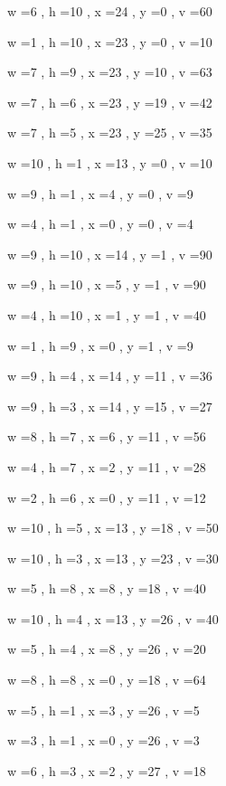 \documentclass[11pt]{article}
\begin{document}


w =6 , h =10 , x =24 , y =0 , v =60
\par
w =1 , h =10 , x =23 , y =0 , v =10
\par
w =7 , h =9 , x =23 , y =10 , v =63
\par
w =7 , h =6 , x =23 , y =19 , v =42
\par
w =7 , h =5 , x =23 , y =25 , v =35
\par
w =10 , h =1 , x =13 , y =0 , v =10
\par
w =9 , h =1 , x =4 , y =0 , v =9
\par
w =4 , h =1 , x =0 , y =0 , v =4
\par
w =9 , h =10 , x =14 , y =1 , v =90
\par
w =9 , h =10 , x =5 , y =1 , v =90
\par
w =4 , h =10 , x =1 , y =1 , v =40
\par
w =1 , h =9 , x =0 , y =1 , v =9
\par
w =9 , h =4 , x =14 , y =11 , v =36
\par
w =9 , h =3 , x =14 , y =15 , v =27
\par
w =8 , h =7 , x =6 , y =11 , v =56
\par
w =4 , h =7 , x =2 , y =11 , v =28
\par
w =2 , h =6 , x =0 , y =11 , v =12
\par
w =10 , h =5 , x =13 , y =18 , v =50
\par
w =10 , h =3 , x =13 , y =23 , v =30
\par
w =5 , h =8 , x =8 , y =18 , v =40
\par
w =10 , h =4 , x =13 , y =26 , v =40
\par
w =5 , h =4 , x =8 , y =26 , v =20
\par
w =8 , h =8 , x =0 , y =18 , v =64
\par
w =5 , h =1 , x =3 , y =26 , v =5
\par
w =3 , h =1 , x =0 , y =26 , v =3
\par
w =6 , h =3 , x =2 , y =27 , v =18
\par
\newpage
\end{document}
